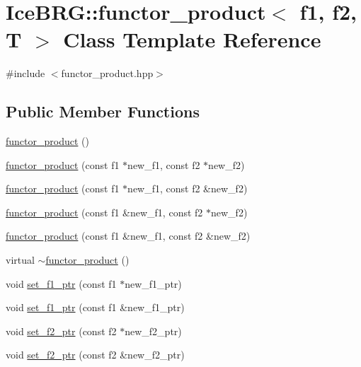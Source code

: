 \hypertarget{classIceBRG_1_1functor__product}{}\section{Ice\+B\+R\+G\+:\+:functor\+\_\+product$<$ f1, f2, T $>$ Class Template Reference}
\label{classIceBRG_1_1functor__product}


{\ttfamily \#include $<$functor\+\_\+product.\+hpp$>$}

\subsection*{Public Member Functions}
\begin{DoxyCompactItemize}
\item 
\hyperlink{classIceBRG_1_1functor__product_a263de47cbf8a828c15f4e74177f59801}{functor\+\_\+product} ()
\item 
\hyperlink{classIceBRG_1_1functor__product_a09c511535f0c64722a2ba05312a86972}{functor\+\_\+product} (const f1 $\ast$new\+\_\+f1, const f2 $\ast$new\+\_\+f2)
\item 
\hyperlink{classIceBRG_1_1functor__product_ad8b48fe7acc524c6803ee44d93735849}{functor\+\_\+product} (const f1 $\ast$new\+\_\+f1, const f2 \&new\+\_\+f2)
\item 
\hyperlink{classIceBRG_1_1functor__product_af440c00b90f2026af6c627536b5ae783}{functor\+\_\+product} (const f1 \&new\+\_\+f1, const f2 $\ast$new\+\_\+f2)
\item 
\hyperlink{classIceBRG_1_1functor__product_ae7c7c8478cc7163d137d9bd24dcca21b}{functor\+\_\+product} (const f1 \&new\+\_\+f1, const f2 \&new\+\_\+f2)
\item 
virtual \hyperlink{classIceBRG_1_1functor__product_a701c252e665501ab0f3361cb7874b66c}{$\sim$functor\+\_\+product} ()
\item 
void \hyperlink{classIceBRG_1_1functor__product_a5ad86153805d2a59b313cf192afb290f}{set\+\_\+f1\+\_\+ptr} (const f1 $\ast$new\+\_\+f1\+\_\+ptr)
\item 
void \hyperlink{classIceBRG_1_1functor__product_acb3f32a97cae6e9f01fe3d1f4ec3cbfc}{set\+\_\+f1\+\_\+ptr} (const f1 \&new\+\_\+f1\+\_\+ptr)
\item 
void \hyperlink{classIceBRG_1_1functor__product_aa3ac11de767b491c8cb6ab0ba2d0d0cd}{set\+\_\+f2\+\_\+ptr} (const f2 $\ast$new\+\_\+f2\+\_\+ptr)
\item 
void \hyperlink{classIceBRG_1_1functor__product_a56f57103f03c25a90d04d585a9955633}{set\+\_\+f2\+\_\+ptr} (const f2 \&new\+\_\+f2\+\_\+ptr)

\end{DoxyCompactItemize}

